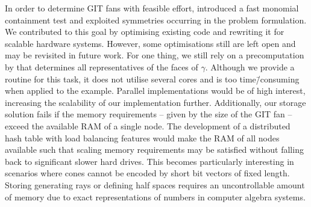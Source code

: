 In order to determine GIT fans with feasible effort, \citeauthor{gitfan_symmetry} introduced a fast monomial containment test and exploited symmetries occurring in the problem formulation. We contributed to this goal by optimising existing code and rewriting it for scalable hardware systems. However, some optimisations still are left open and may be revisited in future work. For one thing, we still rely on a precomputation by \gap{} that determines all representatives of the faces of $\gamma$. Although we provide a routine for this task, it does not utilise several cores and is too time\=/consuming when applied to the \msix{} example. Parallel implementations would be of high interest, increasing the scalability of our implementation further. Additionally, our storage solution fails if the memory requirements -- given by the size of the GIT fan -- exceed the available RAM of a single node. The development of a distributed hash table with load balancing features would make the RAM of all nodes available such that scaling memory requirements may be satisfied without falling back to significant slower hard drives. This becomes particularly interesting in scenarios where cones cannot be encoded by short bit vectors of fixed length. Storing generating rays or defining half spaces requires an uncontrollable amount of memory due to exact representations of numbers in computer algebra systems.